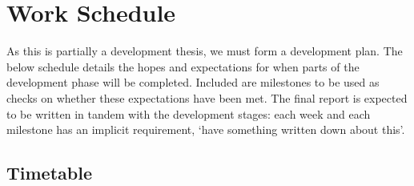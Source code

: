 \documentclass[a4paper,12pt]{article}
\begin{document}
\section{Work Schedule}
As this is partially a development thesis, we must form a development plan.
The below schedule details the hopes and expectations for when parts of the development phase will be completed.
Included are milestones to be used as checks on whether these expectations have been met.
The final report is expected to be written in tandem with the development stages: each week and each milestone has an implicit requirement, `have something written down about this'.

\subsection{Timetable}
\end{document}
